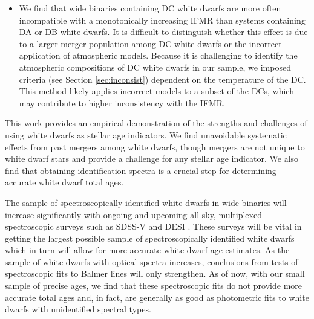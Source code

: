 \documentclass[twocolumn]{aastex631}
\newcommand{\msun}{$M_{\odot}$}
\begin{document}
\begin{itemize}
This result could also be explained by a non-monotonic IFMR, which has gained support in recent years from white dwarfs with masses between 0.6-0.7 \msun \citep{2020NatAs...4.1102M}. We do not find that white dwarfs in inconsistent systems cluster at any mass range when compared to the full sample. 58\% of systems in the DA+DA sample that are inconsistent with a monotonic IFMR have at least one white dwarf with a mass between 0.6 \msun and 0.7\msun, but we expect most to lie in this range given the white dwarf mass distribution peaks here \citep{2019MNRAS.482.5222T}. 

\item We find that wide binaries containing DC white dwarfs are more often incompatible with a monotonically increasing IFMR than systems containing DA or DB white dwarfs. It is difficult to distinguish whether this effect is due to a larger merger population among DC white dwarfs or the incorrect application of atmospheric models. Because it is challenging to identify the atmospheric compositions of DC white dwarfs in our sample, we imposed criteria (see Section \ref{sec:inconsist}) dependent on the temperature of the DC. This method likely applies incorrect models to a subset of the DCs, which may contribute to higher inconsistency with the IFMR.

\end{itemize}

This work provides an empirical demonstration of the strengths and challenges of using white dwarfs as stellar age indicators. We find unavoidable systematic effects from past mergers among white dwarfs, though mergers are not unique to white dwarf stars and provide a challenge for any stellar age indicator. We also find that obtaining identification spectra is a crucial step for determining accurate white dwarf total ages.

The sample of spectroscopically identified white dwarfs in wide binaries will increase significantly with ongoing and upcoming all-sky, multiplexed spectroscopic surveys such as SDSS-V \citep{2023ApJS..267...44A} and DESI \citep{2023ApJ...947...37C}. These surveys will be vital in getting the largest possible sample of spectroscopically identified white dwarfs which in turn will allow for more accurate white dwarf age estimates. As the sample of white dwarfs with optical spectra increases, conclusions from tests of spectroscopic fits to Balmer lines will only strengthen. As of now, with our small sample of precise ages, we find that these spectroscopic fits do not provide more accurate total ages and, in fact, are generally as good as photometric fits to white dwarfs with unidentified spectral types.
\end{document}
